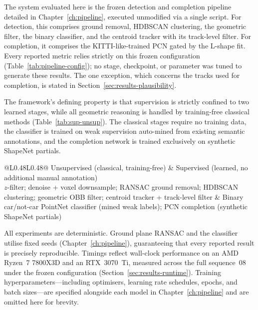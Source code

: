 The system evaluated here is the frozen detection and completion pipeline detailed in
Chapter~\ref{ch:pipeline}, executed unmodified via a single script. For detection, this comprises
ground removal, HDBSCAN clustering, the geometric filter, the binary classifier, and the centroid
tracker with its track-level filter. For completion, it comprises the KITTI-like-trained PCN gated
by the L-shape fit. Every reported metric relies strictly on this frozen configuration
(Table~\ref{tab:pipeline-config}); no stage, checkpoint, or parameter was tuned to generate these
results. The one exception, which concerns the tracks used for completion, is stated in
Section~\ref{sec:results-plausibility}.

The framework's defining property is that supervision is strictly confined to two learned stages,
while all geometric reasoning is handled by training-free classical methods (Table~\ref{tab:sup-unsup}).
The classical stages require no training data, the classifier is trained on weak
supervision auto-mined from existing semantic annotations, and the completion network is trained
exclusively on synthetic ShapeNet partials.

\begin{table}[H]
  \centering
  \caption[Unsupervised and supervised stages of the framework]{The framework's stages by
    supervision: six unsupervised classical stages and two supervised (learned) stages that
    use no additional manual annotation.}
  \label{tab:sup-unsup}
  \small
  \begin{tabular}{@{}L{0.48\linewidth}L{0.48\linewidth}@{}}
    \toprule
    Unsupervised (classical, training-free) & Supervised (learned, no additional manual annotation) \\
    \midrule
    $z$-filter; denoise + voxel downsample; RANSAC ground removal; HDBSCAN clustering;
      geometric OBB filter; centroid tracker + track-level filter
      & Binary car/not-car PointNet classifier (mined weak labels); PCN completion
      (synthetic ShapeNet partials) \\
    \bottomrule
  \end{tabular}
\end{table}

\label{sec:eval-environment}
All experiments are deterministic. Ground plane RANSAC and the classifier utilise fixed seeds
(Chapter~\ref{ch:pipeline}), guaranteeing that every reported result is precisely reproducible.
Timings reflect wall-clock performance on an AMD Ryzen~7 7800X3D and an RTX~3070~Ti, measured
across the full sequence~08 under the frozen configuration (Section~\ref{sec:results-runtime}).
Training hyperparameters---including optimisers, learning rate schedules, epochs, and batch sizes---are
specified alongside each model in Chapter~\ref{ch:pipeline} and are omitted here for brevity.

